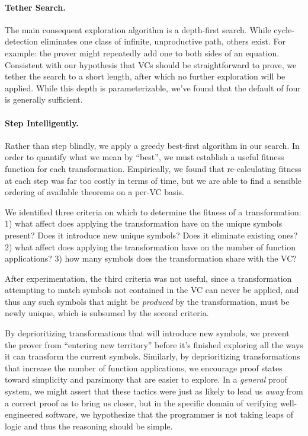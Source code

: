 \paragraph{Tether Search.}  The main consequent exploration algorithm is a depth-first search.  While cycle-detection eliminates one class of infinite, unproductive path, others exist.  For example: the prover might repeatedly add one to both sides of an equation.  Consistent with our hypothesis that VCs should be straightforward to prove, we tether the search to a short length, after which no further exploration will be applied.  While this depth is parameterizable, we've found that the default of four is generally sufficient.

\paragraph{Step Intelligently.}  Rather than step blindly, we apply a greedy best-first algorithm in our search.  In order to quantify what we mean by ``best'', we must establish a useful fitness function for each transformation.  Empirically, we found that re-calculating fitness at each step was far too costly in terms of time, but we are able to find a sensible ordering of available theorems on a per-VC basis.

We identified three criteria on which to determine the fitness of a transformation: 1) what affect does applying the transformation have on the unique symbols present?  Does it introduce new unique symbols?  Does it eliminate existing ones? 2) what affect does applying the transformation have on the number of function applications? 3) how many symbols does the transformation share with the VC?

After experimentation, the third criteria was not useful, since a transformation attempting to match symbols not contained in the VC can never be applied, and thus any such symbols that might be \emph{produced} by the transformation, must be newly unique, which is subsumed by the second criteria.

By deprioritizing transformations that will introduce new symbols, we prevent the prover from ``entering new territory'' before it's finished exploring all the ways it can transform the current symbols.  Similarly, by deprioritizing transformations that increase the number of function applications, we encourage proof states toward simplicity and parsimony that are easier to explore.  In a \emph{general} proof system, we might assert that these tactics were just as likely to lead us \emph{away} from a correct proof as to bring us closer, but in the specific domain of verifying well-engineered software, we hypothesize that the programmer is not taking leaps of logic and thus the reasoning should be simple.
